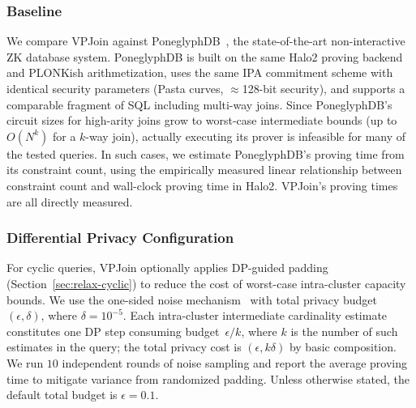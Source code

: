 \documentclass[sigconf]{acmart}
\begin{document}
\subsubsection{Baseline}
We compare VPJoin against PoneglyphDB~\cite{gu2025poneglyphdb}, the state-of-the-art non-interactive ZK database system. PoneglyphDB is built on the same Halo2 proving backend and PLONKish arithmetization, uses the same IPA commitment scheme with identical security parameters (Pasta curves, $\approx$128-bit security), and supports a comparable fragment of SQL including multi-way joins.
Since PoneglyphDB's circuit sizes for high-arity joins grow to worst-case intermediate bounds (up to $O(N^k)$ for a $k$-way join), actually executing its prover is infeasible for many of the tested queries. In such cases, we estimate PoneglyphDB's proving time from its constraint count, using the empirically measured linear relationship between constraint count and wall-clock proving time in Halo2. VPJoin's proving times are all directly measured.

\subsubsection{Differential Privacy Configuration}
\label{subsubsec:dp_config}
For cyclic queries, VPJoin optionally applies DP-guided padding (Section~\ref{sec:relax-cyclic}) to reduce the cost of worst-case intra-cluster capacity bounds.
We use the one-sided noise mechanism~\cite{wang2024special} with total privacy budget $(\epsilon,\delta)$, where $\delta = 10^{-5}$.
Each intra-cluster intermediate cardinality estimate constitutes one DP step consuming budget~$\epsilon/k$, where $k$ is the number of such estimates in the query; the total privacy cost is $(\epsilon, k\delta)$ by basic composition.
We run $10$ independent rounds of noise sampling and report the average proving time to mitigate variance from randomized padding. Unless otherwise stated, the default total budget is $\epsilon = 0.1$.
\end{document}
